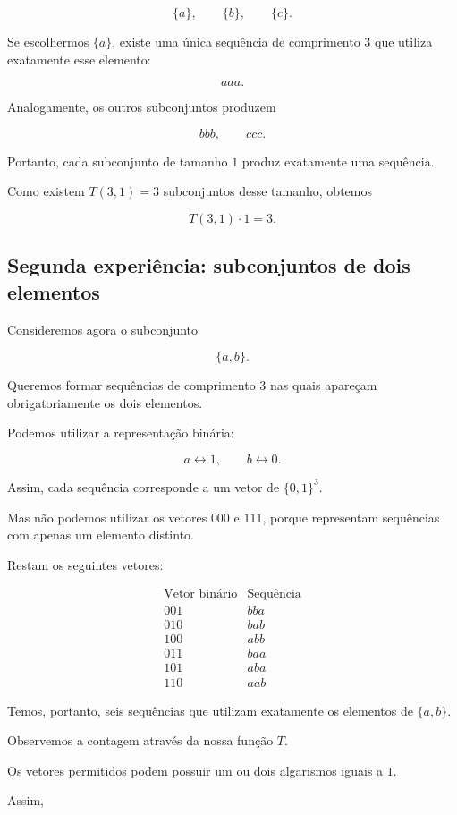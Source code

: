 \documentclass[11pt,a4paper,oneside]{book}
\begin{document}
\[
\{a\},\qquad\{b\},\qquad\{c\}.
\]

Se escolhermos $\{a\}$, existe uma única sequência
de comprimento $3$ que utiliza exatamente
esse elemento:

\[
aaa.
\]

Analogamente, os outros subconjuntos produzem

\[
bbb,\qquad ccc.
\]

Portanto, cada subconjunto de tamanho $1$
produz exatamente uma sequência.

Como existem $T(3,1)=3$ subconjuntos desse tamanho,
obtemos

\[
T(3,1)\cdot1=3.
\]

\subsection*{Segunda experiência: subconjuntos de dois elementos}

Consideremos agora o subconjunto

\[
\{a,b\}.
\]

Queremos formar sequências de comprimento $3$
nas quais apareçam obrigatoriamente os dois elementos.

Podemos utilizar a representação binária:

\[
a\longleftrightarrow1,
\qquad
b\longleftrightarrow0.
\]

Assim, cada sequência corresponde a um vetor
de $\{0,1\}^3$.

Mas não podemos utilizar os vetores $000$ e $111$,
porque representam sequências com apenas um
elemento distinto.

Restam os seguintes vetores:

\[
\begin{array}{c|c}
\text{Vetor binário}&\text{Sequência}\\ \hline
001&bba\\
010&bab\\
100&abb\\
011&baa\\
101&aba\\
110&aab
\end{array}
\]

Temos, portanto, seis sequências que utilizam
exatamente os elementos de $\{a,b\}$.

Observemos a contagem através da nossa função $T$.

Os vetores permitidos podem possuir um ou dois
algarismos iguais a $1$.

Assim,
\end{document}
